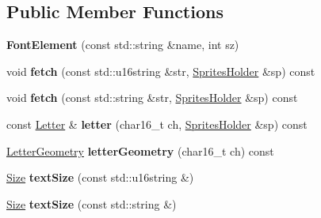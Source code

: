 \subsection*{Public Member Functions}
\begin{DoxyCompactItemize}
\item 
\hypertarget{class_tempest_1_1_font_element_a432715a2fc5cffbc39f7650463b741ee}{{\bfseries Font\+Element} (const std\+::string \&name, int sz)}\label{class_tempest_1_1_font_element_a432715a2fc5cffbc39f7650463b741ee}

\item 
\hypertarget{class_tempest_1_1_font_element_afa0bce442409625de91d6686477327c5}{void {\bfseries fetch} (const std\+::u16string \&str, \hyperlink{class_tempest_1_1_sprites_holder}{Sprites\+Holder} \&sp) const }\label{class_tempest_1_1_font_element_afa0bce442409625de91d6686477327c5}

\item 
\hypertarget{class_tempest_1_1_font_element_af585d1aea01996dd99214a980ecae196}{void {\bfseries fetch} (const std\+::string \&str, \hyperlink{class_tempest_1_1_sprites_holder}{Sprites\+Holder} \&sp) const }\label{class_tempest_1_1_font_element_af585d1aea01996dd99214a980ecae196}

\item 
\hypertarget{class_tempest_1_1_font_element_a68489a8c389a7ab2225642d93f5742a5}{const \hyperlink{struct_tempest_1_1_font_element_1_1_letter}{Letter} \& {\bfseries letter} (char16\+\_\+t ch, \hyperlink{class_tempest_1_1_sprites_holder}{Sprites\+Holder} \&sp) const }\label{class_tempest_1_1_font_element_a68489a8c389a7ab2225642d93f5742a5}

\item 
\hypertarget{class_tempest_1_1_font_element_aa7964a7d9daef4105f8d68a55441e0e8}{\hyperlink{struct_tempest_1_1_font_element_1_1_letter_geometry}{Letter\+Geometry} {\bfseries letter\+Geometry} (char16\+\_\+t ch) const }\label{class_tempest_1_1_font_element_aa7964a7d9daef4105f8d68a55441e0e8}

\item 
\hypertarget{class_tempest_1_1_font_element_a12b583e2aefe0eed127f2a566f910f56}{\hyperlink{struct_tempest_1_1_size}{Size} {\bfseries text\+Size} (const std\+::u16string \&)}\label{class_tempest_1_1_font_element_a12b583e2aefe0eed127f2a566f910f56}

\item 
\hypertarget{class_tempest_1_1_font_element_a6113ce7dd1ed44b3c9dcf0e46c8bc2b5}{\hyperlink{struct_tempest_1_1_size}{Size} {\bfseries text\+Size} (const std\+::string \&)}\label{class_tempest_1_1_font_element_a6113ce7dd1ed44b3c9dcf0e46c8bc2b5}


\end{DoxyCompactItemize}
